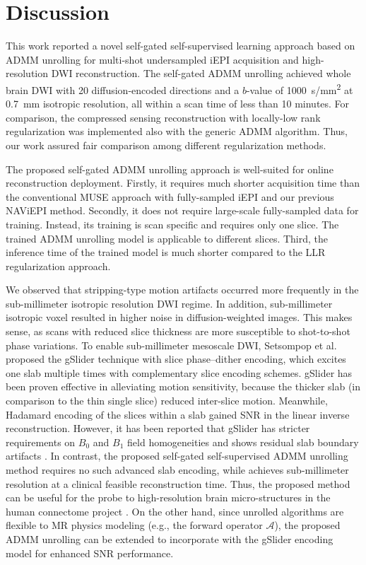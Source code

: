 \documentclass[AMA,STIX2COL,Linenumberson]{MRM}
\begin{document}
\section{Discussion}\label{SEC:DISC}

This work reported a novel self-gated self-supervised learning approach
based on ADMM unrolling
for multi-shot undersampled iEPI acquisition and high-resolution DWI reconstruction.
The self-gated ADMM unrolling achieved whole brain DWI
with 20 diffusion-encoded directions and a $b$-value of \SI{1000}{s/mm^2}
at \SI{0.7}{mm} isotropic resolution,
all within a scan time of less than 10 minutes.
For comparison, the compressed sensing reconstruction with
locally-low rank regularization was implemented also with the generic ADMM algorithm.
Thus, our work assured fair comparison among different regularization methods.

The proposed self-gated ADMM unrolling approach is well-suited
for online reconstruction deployment.
Firstly, it requires much shorter acquisition time than
the conventional MUSE approach with fully-sampled iEPI and
our previous NAViEPI method.
Secondly, it does not require large-scale fully-sampled data for training.
Instead, its training is scan specific and requires only one slice.
The trained ADMM unrolling model is applicable to different slices.
Third, the inference time of the trained model is much
shorter compared to the LLR regularization approach.

We observed that stripping-type motion artifacts occurred more frequently
in the sub-millimeter isotropic resolution DWI regime.
In addition, sub-millimeter isotropic voxel
resulted in higher noise in diffusion-weighted images.
This makes sense, as scans with reduced slice thickness are more susceptible to
shot-to-shot phase variations.
To enable sub-millimeter mesoscale DWI,
Setsompop et al.~\cite{setsompop_2018_gslider}
proposed the gSlider technique with slice phase–dither encoding,
which excites one slab multiple times with complementary slice encoding schemes.
gSlider has been proven effective in alleviating motion sensitivity,
because the thicker slab (in comparison to the thin single slice)
reduced inter-slice motion.
Meanwhile, Hadamard encoding of the slices within a slab gained SNR
in the linear inverse reconstruction.
However, it has been reported that gSlider has stricter requirements
on $B_0$ and $B_1$ field homogeneities
and shows residual slab boundary artifacts
\cite{dai_2021_smslab}.
In contrast, the proposed self-gated self-supervised ADMM unrolling method
requires no such advanced slab encoding,
while achieves sub-millimeter resolution
at a clinical feasible reconstruction time.
Thus, the proposed method can be useful for the probe to high-resolution
brain micro-structures in the human connectome project \cite{huang_2021_hcp2}.
On the other hand, since unrolled algorithms are flexible to
MR physics modeling (e.g., the forward operator $\mathcal{A}$),
the proposed ADMM unrolling can be extended
to incorporate with the gSlider encoding model for enhanced SNR performance.
\end{document}
